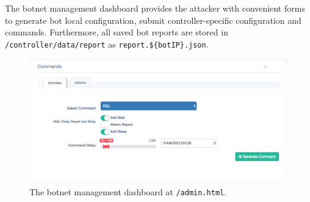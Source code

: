 The botnet management dashboard provides the attacker with convenient forms to generate bot local configuration, submit controller-specific configuration and commands. 
Furthermore, all saved bot reports are stored in \texttt{/controller/data/report} as \texttt{report.\$\{botIP\}.json}.

\begin{figure}[tp]
  \centering
  \includegraphics[scale=0.2]{./fig/commandsWUI.png}
  \caption{The botnet management dashboard at \texttt{/admin.html}.}
    \label{fig:controller-botnet-dashboard}
\end{figure}


